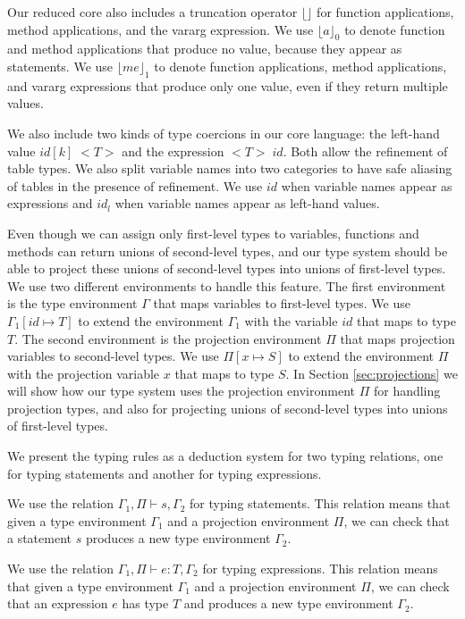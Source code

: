 \documentclass{sigplanconf}
\newcommand{\env}{\Gamma}
\newcommand{\penv}{\Pi}
\begin{document}
Our reduced core also includes a truncation operator $\lfloor \rfloor$ for
function applications, method applications, and the vararg expression.
We use $\lfloor a \rfloor_{0}$ to denote function and method applications
that produce no value, because they appear as statements.
We use $\lfloor me \rfloor_{1}$ to denote function applications,
method applications, and vararg expressions that produce only one value,
even if they return multiple values.

We also include two kinds of type coercions in our core language:
the left-hand value $id[k] \; {<}T{>}$ and the expression ${<}T{>} \;id$.
Both allow the refinement of table types.
We also split variable names into two categories to have safe aliasing
of tables in the presence of refinement.
We use $id$ when variable names appear as expressions and $id_{l}$ when
variable names appear as left-hand values.

Even though we can assign only first-level types to variables,
functions and methods can return unions of second-level types,
and our type system should be able to project these unions of
second-level types into unions of first-level types.
We use two different environments to handle this feature.
The first environment is the type environment $\env$ that maps
variables to first-level types.
We use $\env_{1}[id \mapsto T]$ to extend the environment $\env_{1}$
with the variable $id$ that maps to type $T$.
The second environment is the projection environment $\penv$ that
maps projection variables to second-level types.
We use $\penv[x \mapsto S]$ to extend the environment $\penv$
with the projection variable $x$ that maps to type $S$.
In Section \ref{sec:projections} we will show how our type system uses the
projection environment $\penv$ for handling projection types,
and also for projecting unions of second-level types into
unions of first-level types.

We present the typing rules as a deduction system for two typing relations,
one for typing statements and another for typing expressions.

We use the relation $\env_{1}, \penv \vdash s, \env_{2}$ for typing statements.
This relation means that given a type environment $\env_{1}$
and a projection environment $\penv$, we can check that a statement $s$
produces a new type environment $\env_{2}$.

We use the relation $\env_{1}, \penv \vdash e : T, \env_{2}$ for typing expressions.
This relation means that given a type environment $\env_{1}$
and a projection environment $\penv$, we can check that an expression $e$ has
type $T$ and produces a new type environment $\env_{2}$.
\end{document}
